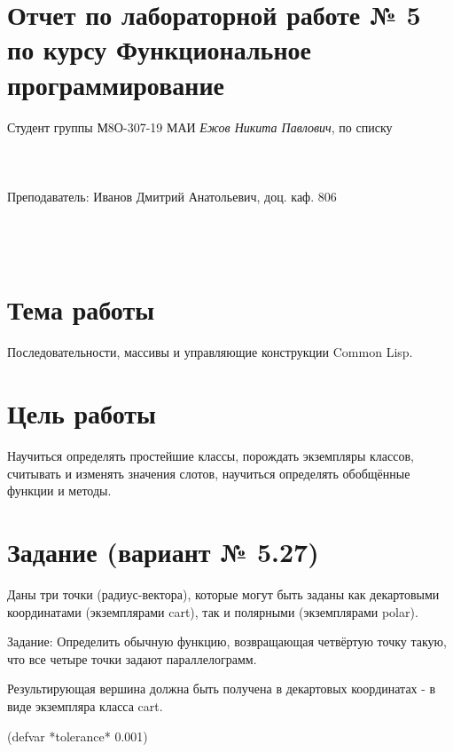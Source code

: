 \documentclass[12pt]{article}
\begin{document}
\section*{Отчет по лабораторной работе № 5 \\
по курсу \guillemotleft Функциональное программирование\guillemotright}
\begin{flushright}
Студент группы М8О-307-19 МАИ \textit{Ежов Никита Павлович},  по списку \\
 \\
 \\
\ \\
Преподаватель: Иванов Дмитрий Анатольевич, доц. каф. 806 \\
 \\
 \\
 \\

\end{flushright}

\section{Тема работы}
Последовательности, массивы и управляющие конструкции Common Lisp.

\section{Цель работы}
Научиться определять простейшие классы, порождать экземпляры классов, считывать и изменять значения слотов, научиться определять обобщённые функции и методы.


\section{Задание (вариант № 5.27)}
Даны три точки (радиус-вектора), которые могут быть заданы как декартовыми координатами (экземплярами cart), так и полярными (экземплярами polar).

Задание: Определить обычную функцию, возвращающая четвёртую точку такую, что все четыре точки задают параллелограмм.

Результирующая вершина должна быть получена в декартовых координатах - в виде экземпляра класса cart.

(defvar *tolerance* 0.001)
\end{document}
